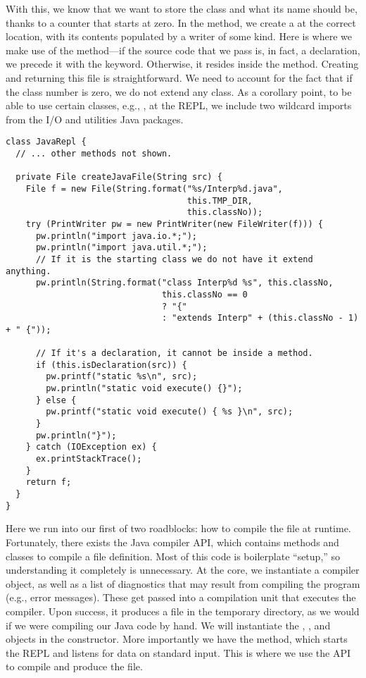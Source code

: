 With this, we know that we want to store the class and what its name should be, thanks to a counter that starts at zero. In the  method, we create a  at the correct location, with its contents populated by a writer of some kind. Here is where we make use of the  method---if the source code that we pass is, in fact, a declaration, we precede it with the  keyword. Otherwise, it resides inside the  method. Creating and returning this file is straightforward. We need to account for the fact that if the class number is zero, we do not extend any class. As a corollary point, to be able to use certain classes, e.g., , at the REPL, we include two wildcard imports from the I/O and utilities Java packages.

\begin{cl}[]{}
\begin{lstlisting}[language=MyJava]
class JavaRepl {
  // ... other methods not shown.
  
  private File createJavaFile(String src) {
    File f = new File(String.format("%s/Interp%d.java",
                                    this.TMP_DIR, 
                                    this.classNo));
    try (PrintWriter pw = new PrintWriter(new FileWriter(f))) {
      pw.println("import java.io.*;");
      pw.println("import java.util.*;");
      // If it is the starting class we do not have it extend anything.
      pw.println(String.format("class Interp%d %s", this.classNo,
                               this.classNo == 0
                               ? "{" 
                               : "extends Interp" + (this.classNo - 1) + " {"));

      // If it's a declaration, it cannot be inside a method.
      if (this.isDeclaration(src)) {
        pw.printf("static %s\n", src);
        pw.println("static void execute() {}");
      } else {
        pw.printf("static void execute() { %s }\n", src);
      }
      pw.println("}");
    } catch (IOException ex) {
      ex.printStackTrace();
    }
    return f;
  }
}
\end{lstlisting}
\end{cl}

Here we run into our first of two roadblocks: how to compile the file at runtime. Fortunately, there exists the Java compiler API, which contains methods and classes to compile a file definition. Most of this code is boilerplate ``setup,'' so understanding it completely is unnecessary. At the core, we instantiate a compiler object, as well as a list of diagnostics that may result from compiling the program (e.g., error messages). These get passed into a compilation unit that executes the compiler. Upon success, it produces a  file in the temporary directory, as we would if we were compiling our Java code by hand. We will instantiate the , , and  objects in the constructor. More importantly we have the  method, which starts the REPL and listens for data on standard input. This is where we use the API to compile and produce the  file.   

